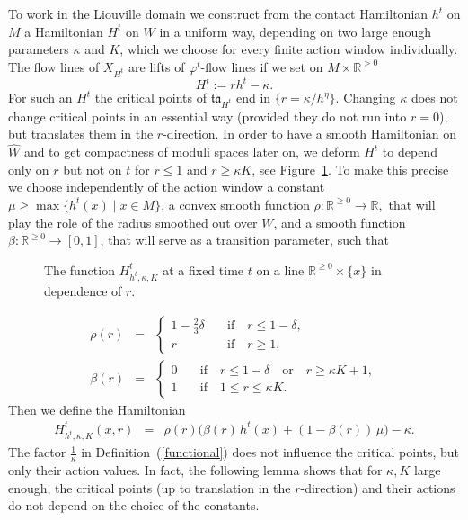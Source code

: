 \documentclass{amsart}
\newcommand{\tacal}{{\mathfrak{ta}}}
\newcommand{\RR}{\mathbb{R}}
\newcommand{\haat}{\widehat}
\theoremstyle{definition}
\theoremstyle{remark}
\numberwithin{equation}{section}
\begin{document}
To work in the Liouville domain we construct from the contact Hamiltonian $h^t$ on $M$ a Hamiltonian $H^t$ on $W$ in a uniform way, depending on two large enough parameters $\kappa$ and $K$, which we choose for every finite action window individually. The flow lines of $X_{H^t}$ are lifts of $\varphi^t$-flow lines if we set on $M\times\RR^{> 0}$
\begin{equation}
H^t:=rh^t-\kappa.
\label{primitivesH}
\end{equation}
 For such an $H^t$ the critical points of $\tacal_{H^t}$ end in $\{r=\kappa/h^\eta\}$. Changing $\kappa$ does not change critical points in an essential way (provided they do not run into $r=0$), but translates them in the $r$-direction. In order to have a smooth Hamiltonian on $\haat W$ and to get compactness of moduli spaces later on, we deform $H^t$ to depend only on $r$ but not on $t$ for $r\leq1$ and $r\geq\kappa K$, see Figure~\ref{fig:Hr}. To make this precise we choose independently of the action window a constant $\mu\geq\max\{h^t(x)\mid x\in M\}$, a convex smooth function $\rho:\RR^{\geq 0}\to\RR,$ that will play the role of the radius smoothed out over $W$, and a smooth function $\beta:\RR^{\geq0}\to[0,1]$, that will serve as a transition parameter, such that

\begin{figure}[h]
	\caption{The function $H^t_{h^t,\kappa,K}$ at a fixed time $t$ on a line $\RR^{\geq 0}\times \{x\}$ in dependence of $r$.}
	\label{fig:Hr}
\end{figure}

\begin{eqnarray*}
	\rho(r)&=&\begin{cases} 1-\frac23\delta &\quad\mbox{if}\quad r\leq1-\delta,\\r&\quad\mbox{if}\quad r\geq 1,\end{cases}\\
	\beta(r)&=&\begin{cases}0&\quad\mbox{if}\quad r\leq1-\delta \quad \mbox{or}\quad r\geq \kappa K+1,\\1&\quad\mbox{if}\quad 1\leq r\leq \kappa K.\end{cases}
\end{eqnarray*}
Then we define the Hamiltonian
\begin{eqnarray*}
	H^t_{h^t,\kappa,K}(x,r)&=&\rho(r)\Big(\beta(r)\,h^t(x)+(1-\beta(r))\,\mu\Big)-\kappa.
\end{eqnarray*}
The factor $\frac1\kappa$ in Definition~(\ref{functional}) does not influence the critical points, but only their action values. In fact, the following lemma shows that for $\kappa,K$ large enough, the critical points (up to translation in the $r$-direction) and their actions do not depend on the choice of the constants.
\end{document}
